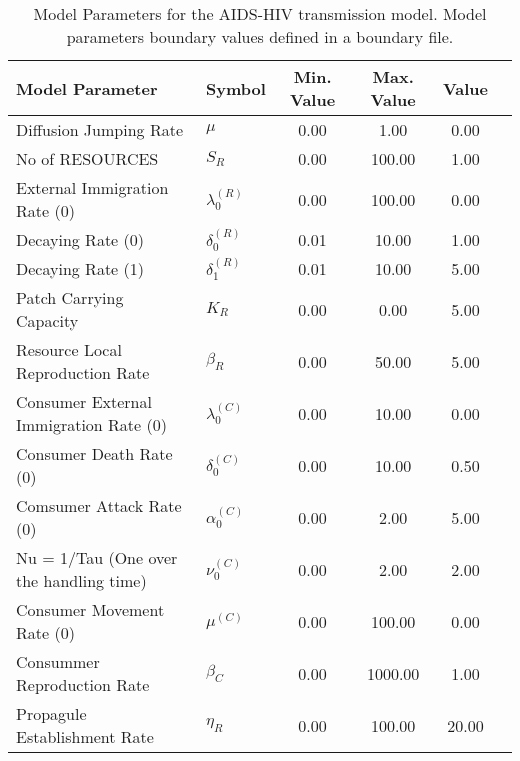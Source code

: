 \begin{table}
\centering
\begin{tabular}{p{5cm}lcccc}
{\bf Model Parameter} & {\bf Symbol} & {\bf Min. Value} & {\bf Max. Value} & {\bf Value}\\
\hline\hline
Diffusion Jumping Rate & $\mu$ & 0.00 & 1.00 & 0.00\\
No of RESOURCES & $S_R$ & 0.00 & 100.00 & 1.00\\
External Immigration Rate (0) & $\lambda^{(R)}_0$ & 0.00 & 100.00 & 0.00\\
Decaying Rate (0) & $\delta^{(R)}_0$ & 0.01 & 10.00 & 1.00\\
Decaying Rate (1) & $\delta^{(R)}_1$ & 0.01 & 10.00 & 5.00\\
Patch Carrying Capacity & $K_R$ & 0.00 & 0.00 & 5.00\\
Resource Local Reproduction Rate & $\beta_R$ & 0.00 & 50.00 & 5.00\\
Consumer External Immigration Rate (0) & $\lambda^{(C)}_0$ & 0.00 & 10.00 & 0.00\\
Consumer Death Rate (0) & $\delta^{(C)}_0$ & 0.00 & 10.00 & 0.50\\
Comsumer Attack Rate (0) & $\alpha^{(C)}_0$ & 0.00 & 2.00 & 5.00\\
Nu = 1/Tau (One over the handling time) & $\nu^{(C)}_0$ & 0.00 & 2.00 & 2.00\\
Consumer Movement Rate (0) & $\mu^{(C)}$ & 0.00 & 100.00 & 0.00\\
Consummer Reproduction Rate & $\beta_C$ & 0.00 & 1000.00 & 1.00\\
Propagule Establishment Rate & $\eta_R$ & 0.00 & 100.00 & 20.00\\
\hline\hline
\end{tabular}
\caption{Model Parameters for the AIDS-HIV transmission model. Model parameters boundary values defined in a boundary file.}
\end{table}

